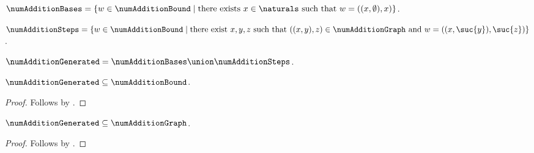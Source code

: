 \begin{definition}\label{num_addition_bases}
    $\numAdditionBases =
        \{w\in\numAdditionBound\mid
            \text{there exists $x\in\naturals$ such that
                $w=((x,\emptyset),x)$}\}$.
\end{definition}

\begin{definition}\label{num_addition_steps}
    $\numAdditionSteps =
        \{w\in\numAdditionBound\mid
            \text{there exist $x,y,z$ such that
                $((x,y),z)\in\numAdditionGraph$ and
                $w=((x,\suc{y}),\suc{z})$}\}$.
\end{definition}

\begin{definition}\label{num_addition_generated}
    $\numAdditionGenerated =
        \numAdditionBases\union\numAdditionSteps$.
\end{definition}

\begin{proposition}\label{num_addition_generated_bound}
    $\numAdditionGenerated\subseteq\numAdditionBound$.
\end{proposition}
\begin{proof}
    Follows by .
\end{proof}

\begin{proposition}\label{num_addition_generated_subset_graph}
    $\numAdditionGenerated\subseteq\numAdditionGraph$.
\end{proposition}
\begin{proof}
    Follows by .
\end{proof}

